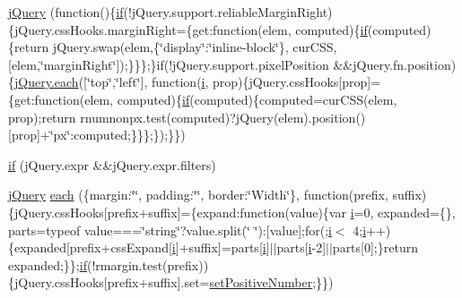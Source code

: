 \begin{DoxyCompactItemize}
\item 
\hyperlink{_scripts_2jquery-1_810_82_8js_a5e01048fbd3a30b44e8d491d8945c457}{j\+Query} (function()\{\hyperlink{_scripts_2respond_8min_8js_a93851d60dd037a83509a1757b9ee7b66}{if}(!j\+Query.\+support.\+reliable\+Margin\+Right)\{j\+Query.\+css\+Hooks.\+margin\+Right=\{get\+:function(elem, computed)\{\hyperlink{_scripts_2respond_8min_8js_a93851d60dd037a83509a1757b9ee7b66}{if}(computed)\{return j\+Query.\+swap(elem,\{\char`\"{}display\char`\"{}\+:\char`\"{}inline-\/block\char`\"{}\}, cur\+C\+S\+S, \mbox{[}elem,\char`\"{}margin\+Right\char`\"{}\mbox{]});\}\}\};\}if(!j\+Query.\+support.\+pixel\+Position \&\&j\+Query.\+fn.\+position)\{\hyperlink{_scripts_2jquery-1_810_82_8min_8js_af24c9ea1e34372f8c8b312b35586008d}{j\+Query.\+each}(\mbox{[}\char`\"{}top\char`\"{},\char`\"{}left\char`\"{}\mbox{]}, function(\hyperlink{jquery_8unobtrusive-ajax_8min_8js_a84da5ff1aa6008a770fb28040f6b0569}{i}, prop)\{j\+Query.\+css\+Hooks\mbox{[}prop\mbox{]}=\{get\+:function(elem, computed)\{\hyperlink{_scripts_2respond_8min_8js_a93851d60dd037a83509a1757b9ee7b66}{if}(computed)\{computed=cur\+C\+S\+S(elem, prop);return rnumnonpx.\+test(computed)?j\+Query(elem).position()\mbox{[}prop\mbox{]}+\char`\"{}px\char`\"{}\+:computed;\}\}\};\});\}\})
\item 
\hyperlink{_scripts_2jquery-1_810_82_8js_a0335a19470806a284d8c38df8f5b5718}{if} (j\+Query.\+expr \&\&j\+Query.\+expr.\+filters)
\item 
\hyperlink{_scripts_2jquery-1_810_82_8js_a5e01048fbd3a30b44e8d491d8945c457}{j\+Query} \hyperlink{_scripts_2jquery-1_810_82_8js_a4d613a6d16c025ab901ff536b58f9ecd}{each} (\{margin\+:\char`\"{}\char`\"{}, padding\+:\char`\"{}\char`\"{}, border\+:\char`\"{}Width\char`\"{}\}, function(prefix, suffix)\{j\+Query.\+css\+Hooks\mbox{[}prefix+suffix\mbox{]}=\{expand\+:function(value)\{var \hyperlink{jquery_8unobtrusive-ajax_8min_8js_a84da5ff1aa6008a770fb28040f6b0569}{i}=0, expanded=\{\}, parts=typeof value===\char`\"{}string\char`\"{}?value.\+split(\char`\"{} \char`\"{})\+:\mbox{[}value\mbox{]};for(;\hyperlink{jquery_8unobtrusive-ajax_8min_8js_a84da5ff1aa6008a770fb28040f6b0569}{i}$<$ 4;\hyperlink{jquery_8unobtrusive-ajax_8min_8js_a84da5ff1aa6008a770fb28040f6b0569}{i}++)\{expanded\mbox{[}prefix+css\+Expand\mbox{[}\hyperlink{jquery_8unobtrusive-ajax_8min_8js_a84da5ff1aa6008a770fb28040f6b0569}{i}\mbox{]}+suffix\mbox{]}=parts\mbox{[}\hyperlink{jquery_8unobtrusive-ajax_8min_8js_a84da5ff1aa6008a770fb28040f6b0569}{i}\mbox{]}$\vert$$\vert$parts\mbox{[}\hyperlink{jquery_8unobtrusive-ajax_8min_8js_a84da5ff1aa6008a770fb28040f6b0569}{i}-\/2\mbox{]}$\vert$$\vert$parts\mbox{[}0\mbox{]};\}return expanded;\}\};\hyperlink{_scripts_2respond_8min_8js_a93851d60dd037a83509a1757b9ee7b66}{if}(!rmargin.\+test(prefix))\{j\+Query.\+css\+Hooks\mbox{[}prefix+suffix\mbox{]}.set=\hyperlink{_scripts_2jquery-1_810_82_8js_a049182834e8b4b2d7485cd919ed272d7}{set\+Positive\+Number};\}\})

\end{DoxyCompactItemize}
